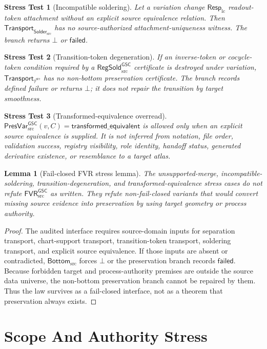 \documentclass[11pt]{article}
\newcommand{\RespLC}{\mathsf{Resp}_{\mathrm{lc}}}
\newcommand{\RegSold}{\mathsf{RegSold}_{\mathrm{src}}^{\mathsf{GSC}}}
\newcommand{\FVR}{\mathsf{FVR}_{\mathrm{src}}^{\mathsf{GSC}}}
\newcommand{\PresVar}{\mathsf{PresVar}_{\mathrm{src}}^{\mathsf{GSC}}}
\newcommand{\BottomSrc}{\mathsf{Bottom}_{\mathrm{src}}}
\newcommand{\SolderSrc}{\mathsf{Solder}_{\mathrm{src}}}
\newcommand{\Tau}{\widehat{\tau}^{\mathrm{src}}}
\newcommand{\Bot}{\bot}
\newtheorem{stress}{Stress Test}
\newtheorem{lemma}{Lemma}
\begin{document}
\begin{stress}[Incompatible soldering]
Let a variation change \(\RespLC\) readout-token attachment without an
explicit source equivalence relation. Then \(\mathsf{Transport}_{\SolderSrc}\)
has no source-authorized attachment-uniqueness witness. The branch returns
\(\Bot\) or \(\mathsf{failed}\).
\end{stress}

\begin{stress}[Transition-token degeneration]
If an inverse-token or cocycle-token condition required by a \(\RegSold\)
certificate is destroyed under variation, \(\mathsf{Transport}_{\Tau}\) has
no non-bottom preservation certificate. The branch records defined failure or
returns \(\Bot\); it does not repair the transition by target smoothness.
\end{stress}

\begin{stress}[Transformed-equivalence overread]
\(\PresVar(v,C)=\mathsf{transformed\_equivalent}\) is allowed only when an
explicit source equivalence is supplied. It is not inferred from notation,
file order, validation success, registry visibility, role identity, handoff
status, generated derivative existence, or resemblance to a target atlas.
\end{stress}

\begin{lemma}[Fail-closed FVR stress lemma]
The unsupported-merge, incompatible-soldering, transition-degeneration, and
transformed-equivalence stress cases do not refute \(\FVR\) as written. They
refute non-fail-closed variants that would convert missing source evidence
into preservation by using target geometry or process authority.
\end{lemma}

\begin{proof}
The audited interface requires source-domain inputs for separation transport,
chart-support transport, transition-token transport, soldering transport, and
explicit source equivalence. If those inputs are absent or contradicted,
\(\BottomSrc\) forces \(\Bot\) or the preservation branch records
\(\mathsf{failed}\). Because forbidden target and process-authority premises
are outside the source data universe, the non-bottom preservation branch
cannot be repaired by them. Thus the law survives as a fail-closed interface,
not as a theorem that preservation always exists.
\end{proof}

\section{Scope And Authority Stress}
\end{document}
